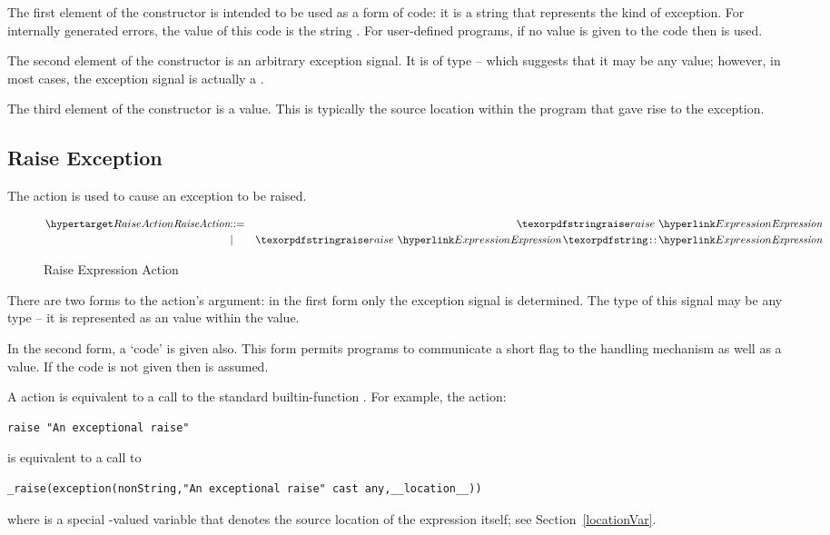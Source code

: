 The first element of the  constructor is intended to be used as a form of code: it is a string that represents the kind of exception. For internally generated errors, the value of this code is the string . For user-defined programs, if no value is given to the code then  is used.

The second element of the  constructor is an arbitrary exception signal. It is of type  -- which suggests that it may be any value; however, in most cases, the exception signal is actually a .

The third element of the  constructor is a  value. This is typically the source location within the program that gave rise to the exception.

\subsection{Raise Exception}
\label{raiseAction}
The  action is used to cause an exception to be raised.

\begin{figure}[htbp]
\begin{eqnarray*}
\ntDef{RaiseAction}&\arrow&\q{raise}\ \ntRef{Expression}\\
&\choice&\q{raise}\ \ntRef{Expression}\,\q{:}\,\ntRef{Expression}
\end{eqnarray*}
\caption{Raise Expression Action}
\label{raiseActionFig}
\end{figure}
There are two forms to the  action's argument: in the first form only the  exception signal is determined. The type of this signal may be any type -- it is represented as an  value within the  value.

In the second form, a  `code' is given also. This form permits programs to communicate a short flag to the handling mechanism as well as a value. If the code is not given then  is assumed.

A  action is equivalent to a call to the standard builtin-function . For example, the  action:
\begin{lstlisting}
raise "An exceptional raise"
\end{lstlisting}
is equivalent to a call to 
\begin{lstlisting}
_raise(exception(nonString,"An exceptional raise" cast any,__location__))
\end{lstlisting}
where  is a special -valued variable that denotes the source location of the expression itself; see Section~\vref{locationVar}.

